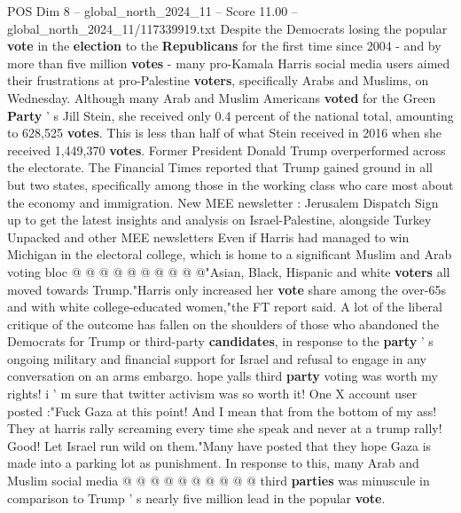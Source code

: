 \begin{textsample}{POS Dim 8 – global\_north\_2024\_11 – Score 11.00 – global\_north\_2024\_11/117339919.txt}  \label{ex:f8_pos_155}
Despite the Democrats losing the popular \textbf{vote} in the \textbf{election} to the \textbf{Republicans} for the first time since 2004 - and by more than five million \textbf{votes} - many pro-Kamala Harris social media users aimed their frustrations at pro-Palestine \textbf{voters}, specifically Arabs and Muslims, on Wednesday.
Although many Arab and Muslim Americans \textbf{voted} for the Green \textbf{Party} ' s Jill Stein, she received only 0.4 percent of the national total, amounting to 628,525 \textbf{votes}.
This is less than half of what Stein received in 2016 when she received 1,449,370 \textbf{votes}.
Former President Donald Trump overperformed across the electorate.
The Financial Times reported that Trump gained ground in all but two states, specifically among those in the working class who care most about the economy and immigration.
New MEE newsletter : Jerusalem Dispatch Sign up to get the latest insights and analysis on Israel-Palestine, alongside Turkey Unpacked and other MEE newsletters Even if Harris had managed to win Michigan in the electoral college, which is home to a significant Muslim and Arab voting bloc @ @ @ @ @ @ @ @ @ @"Asian, Black, Hispanic and white \textbf{voters} all moved towards Trump."Harris only increased her \textbf{vote} share among the over-65s and with white college-educated women,"the FT report said.
A lot of the liberal critique of the outcome has fallen on the shoulders of those who abandoned the Democrats for Trump or third-party \textbf{candidates}, in response to the \textbf{party} ' s ongoing military and financial support for Israel and refusal to engage in any conversation on an arms embargo. hope yalls third \textbf{party} voting was worth my rights! i ' m sure that twitter activism was so worth it!
One X account user posted :"Fuck Gaza at this point!
And I mean that from the bottom of my ass!
They at harris rally screaming every time she speak and never at a trump rally!
Good!
Let Israel run wild on them."Many have posted that they hope Gaza is made into a parking lot as punishment.
In response to this, many Arab and Muslim social media @ @ @ @ @ @ @ @ @ @ third \textbf{parties} was minuscule in comparison to Trump ' s nearly five million lead in the popular \textbf{vote}.

\end{textsample}
